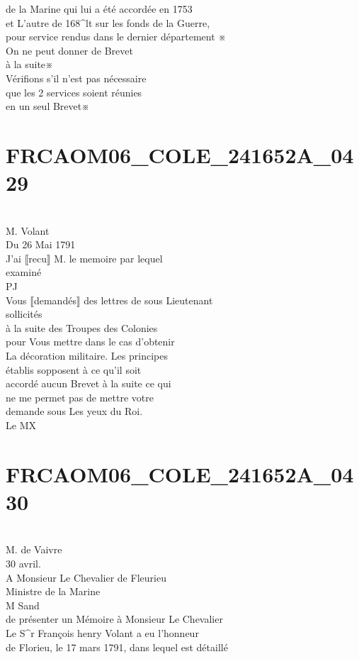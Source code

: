 \documentclass{article}
\begin{document}
\begin{pages}
de la Marine qui lui a été accordée en 1753\\
et L'autre de 168\^{}lt sur les fonds de la Guerre,\\
pour service rendus dans le dernier département ※\\
On ne peut donner de Brevet\\
à la suite※\\
Vérifions s'il n'est pas nécessaire\\
que les 2 services soient réunies\\
en un seul Brevet※
\pend
\endnumbering\beginnumbering\section{FRCAOM06\_COLE\_241652A\_0429}\pstart
\\
M. Volant\\
Du 26 Mai 1791\\
J'ai ⟦recu⟧ M. le memoire par lequel\\
examiné\\
PJ\\
Vous ⟦demandés⟧ des lettres de sous Lieutenant\\
sollicités\\
à la suite des Troupes des Colonies\\
pour Vous mettre dans le cas d'obtenir\\
La décoration militaire. Les principes\\
établis sopposent  à ce qu'il soit\\
accordé aucun Brevet à la suite ce qui\\
ne me permet pas de mettre votre\\
demande sous Les yeux du Roi.\\
Le MX
\pend
\endnumbering\beginnumbering\section{FRCAOM06\_COLE\_241652A\_0430}\pstart
\\
M. de Vaivre\\
30 avril.\\
A Monsieur Le Chevalier de Fleurieu\\
Ministre de la Marine\\
M Sand\\
de présenter un Mémoire à Monsieur Le Chevalier\\
Le S\^{}r François henry Volant a eu l'honneur\\
de Florieu, le 17 mars 1791, dans lequel est détaillé\\

\end{pages}
\end{document}
